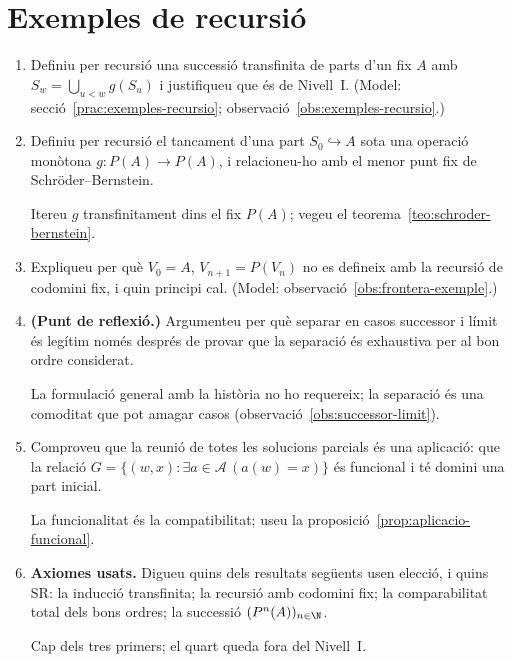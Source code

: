 \section{Exemples de recursió}

\begin{enumerate}[resume]
  \item Definiu per recursió una successió transfinita de parts d'un fix \(A\) amb \(S_w=\bigcup_{u<w}g(S_u)\) i justifiqueu que és de Nivell~I. (Model: secció~\ref{prac:exemples-recursio}; observació~\ref{obs:exemples-recursio}.)

  \item Definiu per recursió el tancament d'una part \(S_0\hookrightarrow A\) sota una operació monòtona \(g\colon P(A)\to P(A)\), i relacioneu-ho amb el menor punt fix de Schröder--Bernstein. \begin{indicacio}Itereu \(g\) transfinitament dins el fix \(P(A)\); vegeu el teorema~\ref{teo:schroder-bernstein}.\end{indicacio}

  \item Expliqueu per què \(V_0=A\), \(V_{n+1}=P(V_n)\) no es defineix amb la recursió de codomini fix, i quin principi cal. (Model: observació~\ref{obs:frontera-exemple}.)

  \item \textbf{(Punt de reflexió.)} Argumenteu per què separar en casos successor i límit és legítim només després de provar que la separació és exhaustiva per al bon ordre considerat. \begin{indicacio}La formulació general amb la història no ho requereix; la separació és una comoditat que pot amagar casos (observació~\ref{obs:successor-limit}).\end{indicacio}

  \item Comproveu que la reunió de totes les solucions parcials és una aplicació: que la relació \(G=\{(w,x):\exists a\in\mathcal A\,(a(w)=x)\}\) és funcional i té domini una part inicial. \begin{indicacio}La funcionalitat és la compatibilitat; useu la proposició~\ref{prop:aplicacio-funcional}.\end{indicacio}

  \item \textbf{Axiomes usats.} Digueu quins dels resultats següents usen elecció, i quins SR: la inducció transfinita; la recursió amb codomini fix; la comparabilitat total dels bons ordres; la successió \((P^n(A))_{n\in\N}\). \begin{indicacio}Cap dels tres primers; el quart queda fora del Nivell~I.\end{indicacio}
\end{enumerate}
